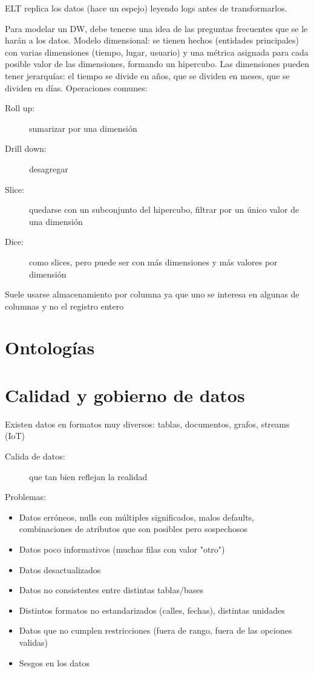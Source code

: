 ELT replica los datos (hace un espejo) leyendo logs antes de transformarlos.

Para modelar un DW, debe tenerse una idea de las preguntas frecuentes que se le harán a los datos.
Modelo dimensional: se tienen hechos (entidades principales) con varias dimensiones (tiempo, lugar, usuario) y una métrica asignada para cada posible valor de las dimensiones, formando un hipercubo.
Las dimensiones pueden tener jerarquías: el tiempo se divide en años, que se dividen en meses, que se dividen en días.
Operaciones comunes:

\begin{description}
	\item[Roll up:] sumarizar por una dimensión
	\item[Drill down:] desagregar
	\item[Slice:] quedarse con un subconjunto del hipercubo, filtrar por un único valor de una dimensión
	\item[Dice:] como slices, pero puede ser con más dimensiones y más valores por dimensión
\end{description}

Suele usarse almacenamiento por columna ya que uno se interesa en algunas de columnas y no el registro entero

\section{Ontologías}

\section{Calidad y gobierno de datos}

Existen datos en formatos muy diversos: tablas, documentos, grafos, streams (IoT)

\begin{description}
	\item[Calida de datos:] que tan bien reflejan la realidad
\end{description}

Problemas:

\begin{itemize}
	\item Datos erróneos, nulls con múltiples significados, malos defaults, combinaciones de atributos que son posibles pero sospechosos
	\item Datos poco informativos (muchas filas con valor "otro")
	\item Datos desactualizados
	\item Datos no consistentes entre distintas tablas/bases
	\item Distintos formatos no estandarizados (calles, fechas), distintas unidades
	\item Datos que no cumplen restricciones (fuera de rango, fuera de las opciones validas)
	\item Sesgos en los datos
\end{itemize}

